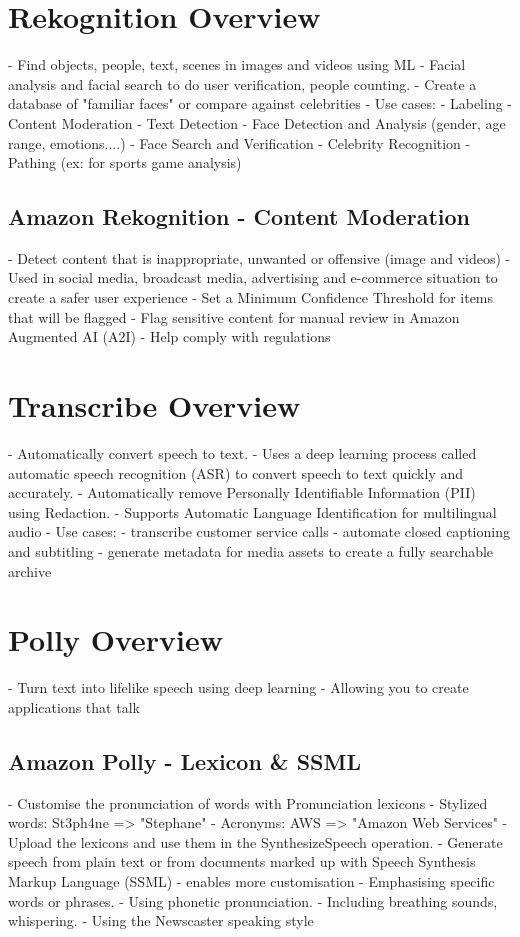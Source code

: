 \documentclass[11pt]{book}
\begin{document}
    \section{Rekognition Overview}
    - Find objects, people, text, scenes in images and videos using ML
    - Facial analysis and facial search to do user verification, people counting.
    - Create a database of "familiar faces" or compare against celebrities
    - Use cases:
    - Labeling
    - Content Moderation
    - Text Detection
    - Face Detection and Analysis (gender, age range, emotions....)
    - Face Search and Verification
    - Celebrity Recognition
    - Pathing (ex: for sports game analysis)

    \subsection{Amazon Rekognition - Content Moderation}
    - Detect content that is inappropriate, unwanted or offensive (image and videos)
    - Used in social media, broadcast media, advertising and e-commerce situation to create a safer user experience
    - Set a Minimum Confidence Threshold for items that will be flagged
    - Flag sensitive content for manual review in Amazon Augmented AI (A2I)
    - Help comply with regulations


    \section{Transcribe Overview}
    - Automatically convert speech to text.
    - Uses a deep learning process called automatic speech recognition (ASR) to convert speech to text quickly and accurately.
    - Automatically remove Personally Identifiable Information (PII) using Redaction.
    - Supports Automatic Language Identification for multilingual audio
    - Use cases:
    - transcribe customer service calls
    - automate closed captioning and subtitling
    - generate metadata for media assets to create a fully searchable archive


    \section{Polly Overview}
    - Turn text into lifelike speech using deep learning
    - Allowing you to create applications that talk

    \subsection{Amazon Polly - Lexicon \& SSML}
    - Customise the pronunciation of words with Pronunciation lexicons
    - Stylized words: St3ph4ne => "Stephane"
    - Acronyms: AWS => "Amazon Web Services"
    - Upload the lexicons and use them in the SynthesizeSpeech operation.
    - Generate speech from plain text or from documents marked up with Speech Synthesis Markup Language (SSML) - enables more customisation
    - Emphasising specific words or phrases.
    - Using phonetic pronunciation.
    - Including breathing sounds, whispering.
    - Using the Newscaster speaking style
\end{document}
